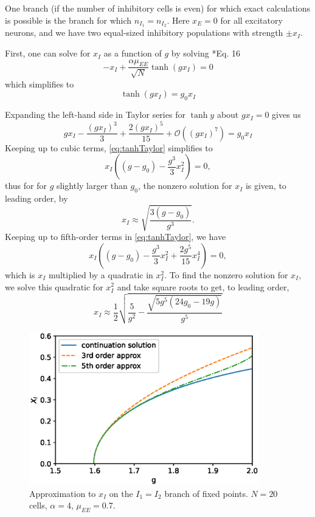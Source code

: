 \documentclass[11pt,reqno]{amsart}
\begin{document}
One branch (if the number of inhibitory cells is even) for which exact calculations is possible is the branch for which $n_{I_1}=n_{I_2}$. Here $x_E = 0$ for all excitatory neurons, and we have two equal-sized inhibitory populations with strength $\pm x_I$. 

First, one can solve for $x_I$ as a function of $g$ by solving \cite{Barreiro2017}*{Eq. 16}
\[
-x_I + \frac{\alpha \mu_{EE} }{\sqrt{N}} \tanh(g x_I) = 0
\]
which simplifies to
\[
\tanh(g x_I) = g_0 x_I
\]

Expanding the left-hand side in Taylor series for $\tanh y$ about $gx_I = 0$ gives us 
\begin{equation}\label{eq:tanhTaylor}
g x_I - \frac{(g x_I)^3}{3} + \frac{2(g x_I)^5}{15} + \mathcal{O}\left( (g x_I)^7 \right) = g_0 x_I
\end{equation}
Keeping up to cubic terms, \cref{eq:tanhTaylor} simplifies to
\[
x_I \left( (g - g_0) - \frac{g^3}{3} x_I^2 \right) = 0,
\]
thus for for $g$ slightly larger than $g_0$, the nonzero solution for $x_I$ is given, to leading order, by
\begin{equation}\label{eq:xIapprox}
x_I \approx \sqrt{ \frac{3(g - g_0) }{g^3}}.
\end{equation}
Keeping up to fifth-order terms in \cref{eq:tanhTaylor}, we have
\[
x_I \left( (g - g_0) - \frac{g^3}{3} x_I^2 + \frac{2 g^5}{15} x_I^4 \right) = 0,
\]
which is $x_I$ multiplied by a quadratic in $x_I^2$. To find the nonzero solution for $x_I$, we solve this quadratic for $x_I^2$ and take square roots to get, to leading order,
\begin{equation*}
x_I \approx \frac{1}{2} \sqrt{ \frac{5}{g^2} - \frac{\sqrt{ 5 g^5( 24 g_0 - 19 g) }}{g^5}}
\end{equation*}

\begin{figure}
    \centering
    \includegraphics[width=10cm]{images/Xiapprox.eps}
    \caption{Approximation to $x_I$ on the $I_1=I_2$ branch of fixed points. $N = 20$ cells, $\alpha = 4$, $\mu_{EE} = 0.7$.}
\end{figure}
\end{document}
